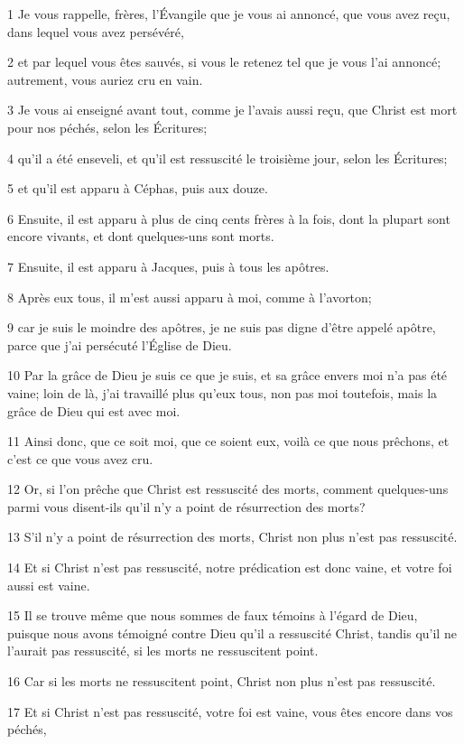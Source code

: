 \par 1 Je vous rappelle, frères, l'Évangile que je vous ai annoncé, que vous avez reçu, dans lequel vous avez persévéré,
\par 2 et par lequel vous êtes sauvés, si vous le retenez tel que je vous l'ai annoncé; autrement, vous auriez cru en vain.
\par 3 Je vous ai enseigné avant tout, comme je l'avais aussi reçu, que Christ est mort pour nos péchés, selon les Écritures;
\par 4 qu'il a été enseveli, et qu'il est ressuscité le troisième jour, selon les Écritures;
\par 5 et qu'il est apparu à Céphas, puis aux douze.
\par 6 Ensuite, il est apparu à plus de cinq cents frères à la fois, dont la plupart sont encore vivants, et dont quelques-uns sont morts.
\par 7 Ensuite, il est apparu à Jacques, puis à tous les apôtres.
\par 8 Après eux tous, il m'est aussi apparu à moi, comme à l'avorton;
\par 9 car je suis le moindre des apôtres, je ne suis pas digne d'être appelé apôtre, parce que j'ai persécuté l'Église de Dieu.
\par 10 Par la grâce de Dieu je suis ce que je suis, et sa grâce envers moi n'a pas été vaine; loin de là, j'ai travaillé plus qu'eux tous, non pas moi toutefois, mais la grâce de Dieu qui est avec moi.
\par 11 Ainsi donc, que ce soit moi, que ce soient eux, voilà ce que nous prêchons, et c'est ce que vous avez cru.
\par 12 Or, si l'on prêche que Christ est ressuscité des morts, comment quelques-uns parmi vous disent-ils qu'il n'y a point de résurrection des morts?
\par 13 S'il n'y a point de résurrection des morts, Christ non plus n'est pas ressuscité.
\par 14 Et si Christ n'est pas ressuscité, notre prédication est donc vaine, et votre foi aussi est vaine.
\par 15 Il se trouve même que nous sommes de faux témoins à l'égard de Dieu, puisque nous avons témoigné contre Dieu qu'il a ressuscité Christ, tandis qu'il ne l'aurait pas ressuscité, si les morts ne ressuscitent point.
\par 16 Car si les morts ne ressuscitent point, Christ non plus n'est pas ressuscité.
\par 17 Et si Christ n'est pas ressuscité, votre foi est vaine, vous êtes encore dans vos péchés,
